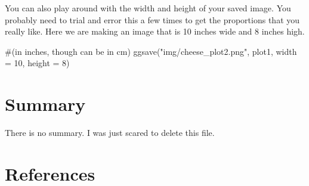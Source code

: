\documentclass[
  letterpaper,
  DIV=11,
  numbers=noendperiod]{scrreprt}
\newenvironment{Shaded}{\begin{snugshade}}{\end{snugshade}}
\newcommand{\AttributeTok}[1]{\textcolor[rgb]{0.40,0.45,0.13}{#1}}
\newcommand{\CommentTok}[1]{\textcolor[rgb]{0.37,0.37,0.37}{#1}}
\newcommand{\DecValTok}[1]{\textcolor[rgb]{0.68,0.00,0.00}{#1}}
\newcommand{\FunctionTok}[1]{\textcolor[rgb]{0.28,0.35,0.67}{#1}}
\newcommand{\NormalTok}[1]{\textcolor[rgb]{0.00,0.23,0.31}{#1}}
\newcommand{\StringTok}[1]{\textcolor[rgb]{0.13,0.47,0.30}{#1}}
\newlength{\cslhangindent}
\newlength{\cslentryspacingunit} %
\newenvironment{CSLReferences}[2] %
 {%
  \setlength{\parindent}{0pt}
  \ifodd #1
  \let\oldpar\par
  \def\par{\hangindent=\cslhangindent\oldpar}
  \fi
  \setlength{\parskip}{#2\cslentryspacingunit}
 }%
 {}
\begin{document}
You can also play around with the width and height of your saved image.
You probably need to trial and error this a few times to get the
proportions that you really like. Here we are making an image that is 10
inches wide and 8 inches high.

\begin{Shaded}
\begin{Highlighting}[]
\CommentTok{\#(in inches, though can be in cm)}
\FunctionTok{ggsave}\NormalTok{(}\StringTok{"img/cheese\_plot2.png"}\NormalTok{, plot1, }\AttributeTok{width =} \DecValTok{10}\NormalTok{, }\AttributeTok{height =} \DecValTok{8}\NormalTok{) }
\end{Highlighting}
\end{Shaded}


\hypertarget{summary}{%
\chapter{Summary}\label{summary}}

There is no summary. I was just scared to delete this file.


\hypertarget{references}{%
\chapter*{References}\label{references}}


\hypertarget{refs}{}
\begin{CSLReferences}{0}{0}
\end{CSLReferences}
\end{document}
